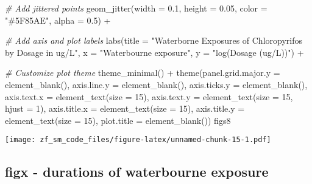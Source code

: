 \documentclass[
]{article}
\newenvironment{Shaded}{\begin{snugshade}}{\end{snugshade}}
\newcommand{\AttributeTok}[1]{\textcolor[rgb]{0.77,0.63,0.00}{#1}}
\newcommand{\CommentTok}[1]{\textcolor[rgb]{0.56,0.35,0.01}{\textit{#1}}}
\newcommand{\DecValTok}[1]{\textcolor[rgb]{0.00,0.00,0.81}{#1}}
\newcommand{\FloatTok}[1]{\textcolor[rgb]{0.00,0.00,0.81}{#1}}
\newcommand{\FunctionTok}[1]{\textcolor[rgb]{0.00,0.00,0.00}{#1}}
\newcommand{\NormalTok}[1]{#1}
\newcommand{\SpecialCharTok}[1]{\textcolor[rgb]{0.00,0.00,0.00}{#1}}
\newcommand{\StringTok}[1]{\textcolor[rgb]{0.31,0.60,0.02}{#1}}
\begin{document}
\begin{Shaded}
\begin{Highlighting}[]
  \CommentTok{\# Add jittered points}
  \FunctionTok{geom\_jitter}\NormalTok{(}\AttributeTok{width =} \FloatTok{0.1}\NormalTok{, }\AttributeTok{height =} \FloatTok{0.05}\NormalTok{, }\AttributeTok{color =} \StringTok{"\#5F85AE"}\NormalTok{, }\AttributeTok{alpha =} \FloatTok{0.5}\NormalTok{) }\SpecialCharTok{+}

  \CommentTok{\# Add axis and plot labels}
  \FunctionTok{labs}\NormalTok{(}\AttributeTok{title =} \StringTok{"Waterborne Exposures of Chloropyrifos by Dosage in ug/L"}\NormalTok{, }\AttributeTok{x =} \StringTok{"Waterbourne exposure"}\NormalTok{, }\AttributeTok{y =} \StringTok{"log(Dosage (ug/L))"}\NormalTok{)  }\SpecialCharTok{+}
  
  \CommentTok{\# Customize plot theme}
  \FunctionTok{theme\_minimal}\NormalTok{() }\SpecialCharTok{+}
  \FunctionTok{theme}\NormalTok{(}\AttributeTok{panel.grid.major.y =} \FunctionTok{element\_blank}\NormalTok{(),}
    \AttributeTok{axis.line.y =} \FunctionTok{element\_blank}\NormalTok{(),}
    \AttributeTok{axis.ticks.y =} \FunctionTok{element\_blank}\NormalTok{(),}
    \AttributeTok{axis.text.x =} \FunctionTok{element\_text}\NormalTok{(}\AttributeTok{size =} \DecValTok{15}\NormalTok{),}
    \AttributeTok{axis.text.y =} \FunctionTok{element\_text}\NormalTok{(}\AttributeTok{size =} \DecValTok{15}\NormalTok{, }\AttributeTok{hjust =} \DecValTok{1}\NormalTok{),}
    \AttributeTok{axis.title.x =} \FunctionTok{element\_text}\NormalTok{(}\AttributeTok{size =} \DecValTok{15}\NormalTok{),}
    \AttributeTok{axis.title.y =} \FunctionTok{element\_text}\NormalTok{(}\AttributeTok{size =} \DecValTok{15}\NormalTok{),}
    \AttributeTok{plot.title =} \FunctionTok{element\_blank}\NormalTok{())}
\NormalTok{figs8}
\end{Highlighting}
\end{Shaded}

\texttt{[image: zf\_sm\_code\_files/figure-latex/unnamed-chunk-15-1.pdf]}

\hypertarget{figx---durations-of-waterbourne-exposure}{%
\subsection{figx - durations of waterbourne
exposure}\label{figx---durations-of-waterbourne-exposure}}
\end{document}
